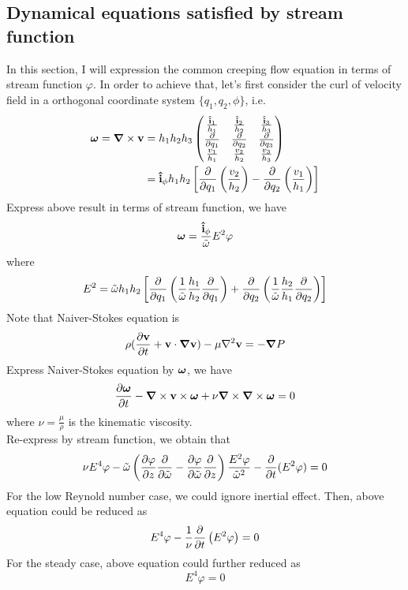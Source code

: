 \documentclass[fontsize=11pt, %
                             paper=a4, %
                             twoside, %
                             captions=tableheading,
                             index=totoc,
                             hyperref]{labbook}
\begin{document}
\subsection{Dynamical equations satisfied by stream function}
In this section, I will expression the common creeping flow equation in terms of stream function $\varphi$. In order to achieve that, let's first consider the curl of velocity field in a orthogonal coordinate system $\{q_1,q_2,\phi\}$, i.e.
\begin{equation}
\begin{aligned}
\mbox{\boldmath$ \omega $}=\mbox{\boldmath$ \nabla $} \times \mathbf{v}&=h_1h_2h_3
\begin{pmatrix}
\frac{\mathbf{\hat{i}}_1}{h_1}&\frac{\mathbf{\hat{i}}_2}{h_2}&\frac{\mathbf{\hat{i}}_3}{h_3}\\
\frac{\partial }{\partial q_1}&\frac{\partial }{\partial q_2}&\frac{\partial }{\partial q_3}\\
\frac{v_1}{h_1}&\frac{v_2}{h_2}&\frac{v_3}{h_3}
\end{pmatrix}\\
&=\mathbf{\hat{i}}_\phi h_1h_2\left[\frac{\partial }{\partial q_1}\left(\frac{v_2}{h_2}\right)-\frac{\partial }{\partial q_2}\left(\frac{v_1}{h_1}\right)\right]
\end{aligned}
\end{equation}
Express above result in terms of stream function, we have
\begin{equation}
\mbox{\boldmath$ \omega $}=\frac{\mathbf{\hat{i}}_\phi}{\tilde\omega}E^2\varphi
\end{equation}
where
\begin{equation}\label{operatorE2}
E^2=\tilde{\omega}h_1h_2\left[\frac{\partial }{\partial q_1}\left(\frac{1}{\tilde{\omega}}\frac{h_1}{h_2}\frac{\partial }{\partial q_1}\right)+\frac{\partial }{\partial q_2}\left(\frac{1}{\tilde{\omega}}\frac{h_2}{h_1}\frac{\partial }{\partial q_2}\right)\right]
\end{equation}
Note that Naiver-Stokes equation is
\begin{equation}
\rho(\frac{\partial \mathbf{v}}{\partial t}+\mathbf{v}\cdot\mbox{\boldmath$ \nabla $} \mathbf{v})-\mu\nabla^2\mathbf{v}=-\mbox{\boldmath$ \nabla $} P
\end{equation}
Express Naiver-Stokes equation by $\mbox{\boldmath$ \omega $}$, we have
\begin{equation}
\frac{\partial \mbox{\boldmath$ \omega $}}{\partial t}-\mbox{\boldmath$ \nabla $} \times \mathbf{v}\times \mbox{\boldmath$ \omega $}+\nu\mbox{\boldmath$ \nabla $} \times \mbox{\boldmath$ \nabla $} \times \mbox{\boldmath$ \omega $}=0
\end{equation}
where $\nu=\frac{\mu}{\rho}$ is the kinematic viscosity.\\
Re-express by stream function, we obtain that
\begin{equation}
\nu E^4\varphi -\tilde{\omega}\left(\frac{\partial \varphi}{\partial z}\frac{\partial }{\partial \tilde{\omega}}-\frac{\partial \varphi}{\partial \tilde{\omega}}\frac{\partial }{\partial z}\right)\frac{E^2\varphi}{\tilde{\omega}^2}-\frac{\partial }{\partial t}(E^2\varphi)=0
\end{equation}
For the low Reynold number case, we could ignore inertial effect. Then, above equation could be reduced as
\begin{equation}
E^4\varphi-\frac{1}{\nu}\frac{\partial }{\partial t}\left(E^2\varphi\right)=0
\end{equation}
For the steady case, above equation could further reduced as
\begin{equation}
E^4\varphi=0
\end{equation}
\end{document}
